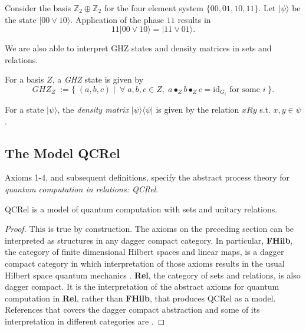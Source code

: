\begin{example}
Consider the basis $\mathbb{Z}_2\oplus\mathbb{Z}_2$ for the four element system $\{00,01,10,11\}$.  Let $|\psi\rangle$ be the state $|00\vee10\rangle$. Application of the phase $11$ results in
\[ 11|00\vee10\rangle = |11\vee01\rangle . \]
\end{example}

We are also able to interpret GHZ states and density matrices in sets and relations.

\begin{defn}
For a basis $Z$, a \emph{GHZ} state is given by
\[ GHZ_Z \; := \{\;(a,b,c)\;|\;\ \forall \;a,b,c \in Z,\;a\bullet_Zb\bullet_Zc = \mbox{id}_{G_i}\mbox{ for some } i\;\}.  \]
\end{defn}

\begin{defn}
For a state $|\psi\rangle$, the \emph{density matrix} $|\psi\rangle\langle\psi|$ is given by the relation $xRy$ s.t. $x,y\in \psi$.
\end{defn}

\subsection{The Model QCRel}

\begin{defn}
Axioms 1-4, and subsequent definitions, specify the abstract process theory for \emph{quantum computation in relations: QCRel}.
\end{defn}

\begin{theorem}
QCRel is a model of quantum computation with sets and unitary relations.
\end{theorem}
\begin{proof}
This is true by construction.  The axioms on the preceding section can be interpreted as structures in any dagger compact category. In particular, {\bf FHilb}, the category of finite dimensional Hilbert spaces and linear maps,  is a dagger compact category in which interpretation of those axioms results in the usual Hilbert space quantum mechanics \cite{coecke-abramsky-cqm}.  {\bf Rel}, the category of sets and relations, is also dagger compact.  It is the interpretation of the abstract axioms for quantum computation in {\bf Rel}, rather than {\bf FHilb}, that produces QCRel as a model. References that covers the dagger compact abstraction and some of its interpretation in different categories are \cite{coecke2011categories,cqm-notes}.
\end{proof}

